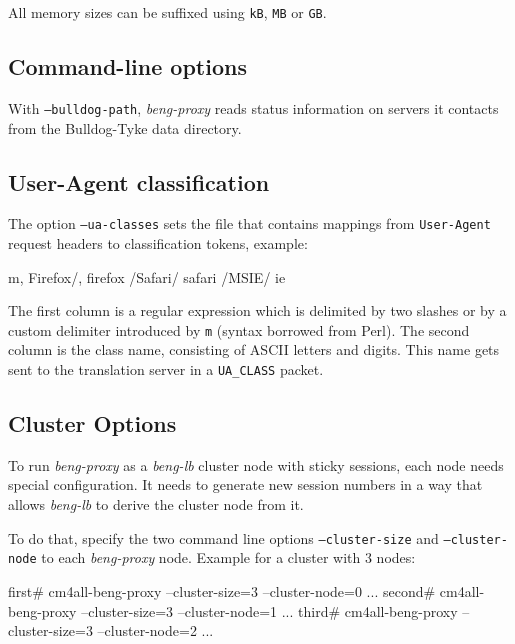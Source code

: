 \documentclass[a4paper,12pt]{article}
\begin{document}
All memory sizes can be suffixed using \texttt{kB}, \texttt{MB} or
\texttt{GB}.

\subsection{Command-line options}

\label{bulldog}
With \texttt{--bulldog-path}, \emph{beng-proxy} reads status
information on servers it contacts from the Bulldog-Tyke data
directory.

\subsection{User-Agent classification}
\label{uaclass}

The option \texttt{--ua-classes} sets the file that contains mappings
from \texttt{User-Agent} request headers to classification tokens,
example:

\begin{verbatim*}
m, Firefox/, firefox
/Safari/ safari
/MSIE/ ie
\end{verbatim*}

The first column is a regular expression which is delimited by two
slashes or by a custom delimiter introduced by \texttt{m} (syntax
borrowed from Perl).  The second column is the class name, consisting
of ASCII letters and digits.  This name gets sent to the translation
server in a \verb|UA_CLASS| packet.

\subsection{Cluster Options}

To run \emph{beng-proxy} as a \emph{beng-lb} cluster node with sticky
sessions, each node needs special configuration.  It needs to generate
new session numbers in a way that allows \emph{beng-lb} to derive the
cluster node from it.

To do that, specify the two command line options
\texttt{--cluster-size} and \texttt{--cluster-node} to each
\emph{beng-proxy} node.  Example for a cluster with 3 nodes:

\begin{verbatim*}
first# cm4all-beng-proxy --cluster-size=3 --cluster-node=0 ...
second# cm4all-beng-proxy --cluster-size=3 --cluster-node=1 ...
third# cm4all-beng-proxy --cluster-size=3 --cluster-node=2 ...
\end{verbatim*}
\end{document}
